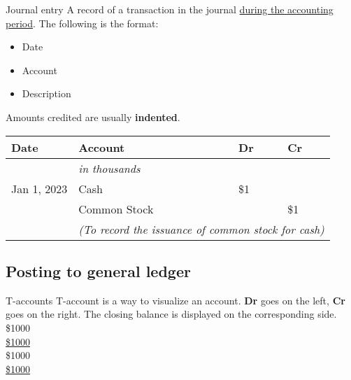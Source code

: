 \begin{definition}
    {Journal entry}
    A record of a transaction in the journal \underline{during the accounting period}. The following is the format:
    \begin{itemize}
        \item Date
        \item Account
        \item Description
    \end{itemize}
    Amounts credited are usually \textbf{indented}.
\end{definition}

\small
\begin{tcolorbox}[colframe=black,colback=white,title=Example Journal Entry]
    \begin{tabular}{llll}
        \textbf{Date} & \textbf{Account}                                                               & \textbf{Dr} & \textbf{Cr} \\
        \hline
                      & \textit{in thousands}                                                          &             &             \\
        Jan 1, 2023   & Cash                                                                           & \$1         &             \\
                      & \quad Common Stock                                                             &             & \$1         \\
                      & \multicolumn{3}{l}{\textit{(To record the issuance of common stock for cash)}}                             \\
    \end{tabular}
\end{tcolorbox}
\normalsize

\subsection{Posting to general ledger}
\label{subsec:post}

\begin{knBox}
    {T-accounts}
    T-account is a way to visualize an account. \textbf{Dr} goes on the left, \textbf{Cr} goes on the right. The closing balance is displayed on the corresponding side.
    \tcblower
    {\$1000\\\hline\underline{\underline{\$1000}}}
    {}
    {\\}
    {\$1000\\\hline\underline{\underline{\$1000}}}
\end{knBox}

